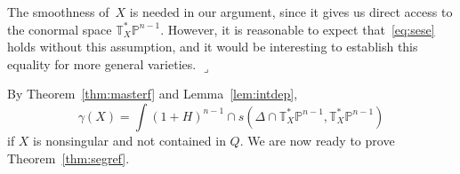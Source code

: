 \documentclass[11pt]{amsart}
\numberwithin{equation}{section}
\newcommand{\Pbb}{{\mathbb{P}}}
\newcommand{\Tbb}{{\mathbb{T}}}
\newcommand{\qede}{\hfill$\lrcorner$}
\begin{document}
\begin{remark}
The smoothness of~$X$ is needed in our argument, since it gives us direct access
to the conormal space $\Tbb^*_X\Pbb^{n-1}$. However, it is reasonable to expect 
that~\eqref{eq:sese} holds without this assumption, and it would be interesting to
establish this equality for more general varieties.
\qede\end{remark}

By Theorem~\ref{thm:masterf} and Lemma~\ref{lem:intdep},
\begin{equation}\label{eq:masterf2}
\gamma(X) = \int (1+H)^{n-1}\cap s(\Delta\cap \Tbb^*_X\Pbb^{n-1}, \Tbb^*_X\Pbb^{n-1})
\end{equation}
if $X$ is nonsingular and not contained in $Q$. We are now ready to prove 
Theorem~\ref{thm:segref}.
\end{document}
